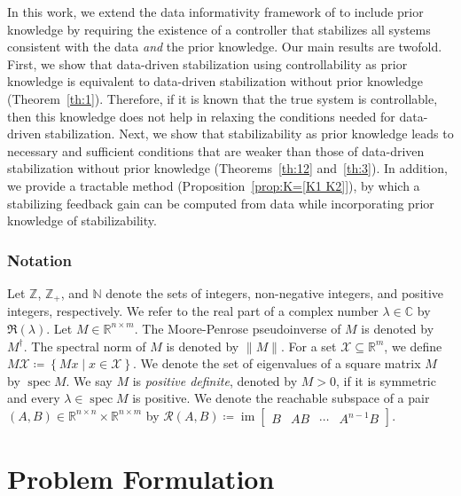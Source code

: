\documentclass[9pt,shortpaper,twoside,web]{ieeecolor}
\DeclareMathOperator{\im}{im}
\DeclareMathOperator{\spec}{spec}
\newcommand{\set}[2]{\left\{#1 \mid #2\right\}}
\begin{document}
In this work, we extend the data informativity framework of \cite{van2020data} to include prior knowledge by requiring the existence of a controller that stabilizes all systems consistent with the data \emph{and} the prior knowledge. Our main results are twofold. First, we show that data-driven stabilization using controllability as prior knowledge is equivalent to data-driven stabilization without prior knowledge (Theorem~\ref{th:1}). Therefore, if it is known that the true system is controllable, then this knowledge does not help in relaxing the conditions needed for data-driven stabilization. Next, we show that stabilizability as prior knowledge leads to necessary and sufficient conditions that are weaker than those of data-driven stabilization without prior knowledge (Theorems~\ref{th:12} and~\ref{th:3}). In addition, we provide a tractable method (Proposition~\ref{prop:K=[K1 K2]}), by which a stabilizing feedback gain can be computed from data while incorporating prior knowledge of stabilizability.  

\subsubsection*{Notation} Let $\mathbb{Z}$, $\mathbb{Z}_+$, and $\mathbb{N}$ denote the sets of integers, non-negative integers, and positive integers, respectively. We refer to the real part of a complex number $\lambda\in\mathbb{C}$ by $\mathfrak{R}(\lambda)$. Let \mbox{$M \in \mathbb{R}^{n \times m}$}. The Moore-Penrose pseudoinverse of $M$ is denoted by $M^\dagger$. The spectral norm of $M$ is denoted by $\|M\|$. For a set $\mathcal{X}\subseteq\mathbb{R}^{m}$, we define $M\mathcal{X}\coloneqq\set{Mx}{x\in\mathcal{X}}$. We denote the set of eigenvalues of a square matrix $M$ by $\spec M$. We say $M$ is \emph{positive definite}, denoted by $M > 0$, if it is symmetric and every $\lambda\in\spec M$ is positive. We denote the reachable subspace of a pair \mbox{$(A,B)\in\mathbb{R}^{n\times n}\times \mathbb{R}^{n\times m}$} by \mbox{$\mathcal{R}(A,B)\coloneqq \im\begin{bmatrix}
B & AB & \cdots & A^{n-1}B
\end{bmatrix}$}. 



\section{Problem Formulation}
\label{sec:II}
\end{document}
